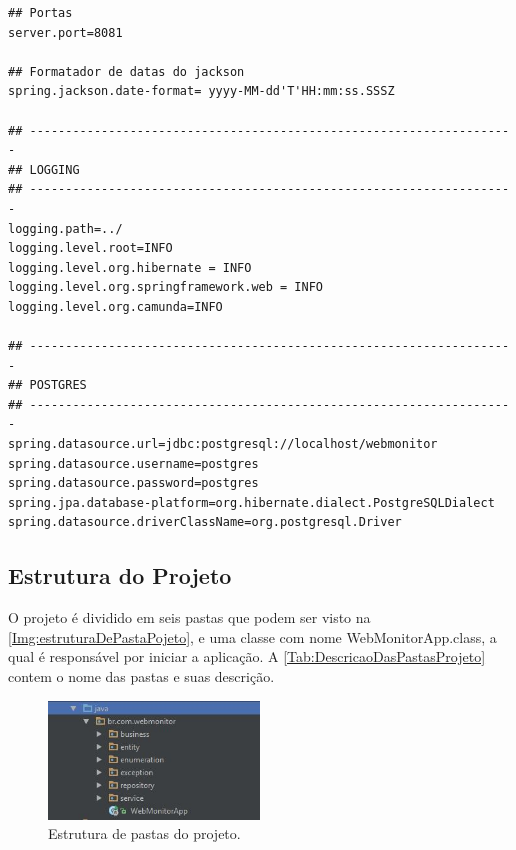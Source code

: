 \begin{lstlisting}[style=LIVRE, label=Func:applicationProperties,caption={[Arquivo application.properties com as principais configurações do projeto.]Arquivo application.properties com as principais configurações do projeto.}]
## Portas
server.port=8081

## Formatador de datas do jackson
spring.jackson.date-format= yyyy-MM-dd'T'HH:mm:ss.SSSZ

## --------------------------------------------------------------------
## LOGGING
## --------------------------------------------------------------------
logging.path=../
logging.level.root=INFO
logging.level.org.hibernate = INFO
logging.level.org.springframework.web = INFO
logging.level.org.camunda=INFO

## --------------------------------------------------------------------
## POSTGRES
## --------------------------------------------------------------------
spring.datasource.url=jdbc:postgresql://localhost/webmonitor
spring.datasource.username=postgres
spring.datasource.password=postgres
spring.jpa.database-platform=org.hibernate.dialect.PostgreSQLDialect
spring.datasource.driverClassName=org.postgresql.Driver

\end{lstlisting}




\subsection{Estrutura do Projeto}\label{subsec:EstruturaDoProjeto}

O projeto é dividido em seis pastas que podem ser visto na \autoref{Img:estruturaDePastaPojeto}, e uma classe com nome WebMonitorApp.class, a qual é responsável por iniciar a aplicação. A \autoref{Tab:DescricaoDasPastasProjeto} contem o nome das pastas e suas descrição.

\begin{figure}[H]
	\centering
	\includegraphics[width=0.5\textwidth]{figuras/estruturaPojeto.JPG}
	\caption[Estrutura de pastas do projeto.]{Estrutura de pastas do projeto.}
	\label{Img:estruturaDePastaPojeto}
	
\end{figure}
	
